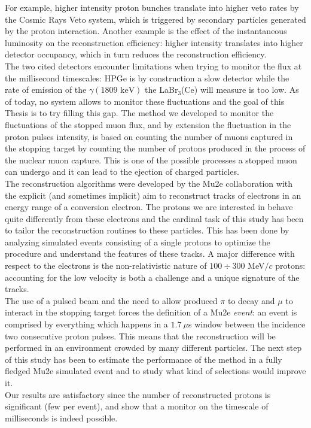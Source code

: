 \documentclass[12pt,a4paper,openright, oneside, titlepage]{book} %
\begin{document}
\begin{changemargin}{1cm}{1cm}
For example, higher intensity proton bunches translate into higher veto rates by the Cosmic Rays Veto system, 
which is triggered by secondary particles generated by the proton interaction. 
Another example is the effect of the instantaneous luminosity on the reconstruction efficiency: higher intensity translates into higher detector occupancy, which in turn reduces the reconstruction efficiency.\\
The two cited detectors encounter limitations when trying to monitor the flux at the millisecond timescales: HPGe is by construction a slow detector while the rate of emission of the $\gamma (1809\textrm{ keV})$ the LaBr$_3$(Ce) will measure is too low.
As of today, no system allows to monitor these fluctuations and the goal of this Thesis is to try filling this gap.
The method we developed to monitor the fluctuations of the stopped muon flux, and by extension the fluctuation in the proton pulses intensity, is based on counting the number of muons captured in the stopping target by counting the number of protons produced in the process of the nuclear muon capture.
This is one of the possible processes a stopped muon can undergo and it can lead to the ejection of charged particles.\\
The reconstruction algorithms were developed by the Mu2e collaboration with the explicit (and sometimes implicit) aim to reconstruct tracks of electrons in an energy range of a conversion electron. 
The protons we are interested in behave quite differently from these electrons and the cardinal task of this study has been to tailor the reconstruction routines to these particles. 
This has been done by analyzing simulated events consisting of a single protons to optimize the procedure and understand the features of these tracks. 
A major difference with respect to the electrons is the non-relativistic nature of $100\div300$ MeV$/c$ protons: accounting for the low velocity is both a challenge and a unique signature of the tracks.\\
The use of a pulsed beam and the need to allow produced $\pi$ to decay and $\mu$ to interact in the stopping target forces the definition of a Mu2e \textit{event}: an event is comprised by everything which happens in a $1.7\ \mu$s window between the incidence two consecutive proton pulses.
This means that the reconstruction will be performed in an environment crowded by many different particles.
The next step of this study has been to estimate the performance of the method in a fully fledged Mu2e simulated event and to study what kind of selections would improve it.\\
Our results are satisfactory since the number of reconstructed protons is significant (few per event), and show that a monitor on the timescale of milliseconds is indeed possible.

\end{changemargin}
\end{document}
